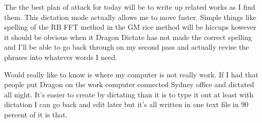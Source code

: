 \documentclass{report}
\begin{document}
The the best plan of attack for today will be to write up related works as I find them. This dictation mode actually allows me to move faster. Simple things like spelling of the RB FFT method in the GM rice method will be hiccups however it should be obvious when it Dragon Dictate has not made the correct spelling and I'll be able to go back through on my second pass and actually revise the phrases into whatever words I need.

Would really like to know is where my computer is not really work. If I had that people put Dragon on the work computer connected Sydney office and dictated all night. It's easier to create by dictating than it is to type it out at least with dictation I can go back and edit later but it's all written in one text file in 90 percent of it is that. 






\ifstandalone


\end{document}
